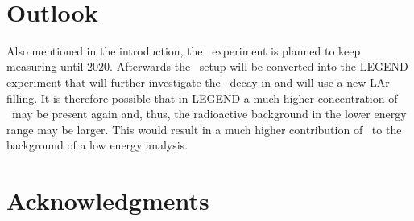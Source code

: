\documentclass[encoding=utf8,british]{tumphthesis}
\begin{document}
\\

\section{Outlook}
Also mentioned in the introduction, the \gerda\ experiment is planned to keep measuring until 2020.
Afterwards the \gerda\ setup will be converted into the LEGEND experiment that will further investigate the \onbb\ decay in  and will use a new LAr filling.
It is therefore possible that in LEGEND a much higher concentration of \Kr\ may be present again and, thus, the radioactive background in the lower energy range may be larger.
This would result in a much higher contribution of \Kr\ to the background of a low energy analysis.
\\





\newpage
\section*{Acknowledgments}




\backmatter
\printbibliography
%
%
\listoffigures
\listoftables
\end{document}
